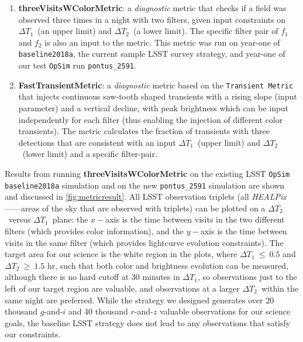 \documentclass[letterpaper,longauthor,trackchanges,twocolumn,onecolappendix,sort&compress]{aastex62}
\newcommand{\dtone}{\ensuremath{\Delta T_1}}
\newcommand{\dttwo}{\ensuremath{\Delta T_2}}
\begin{document}
\begin{enumerate}
\item
{\bf threeVisitsWColorMetric}: a {\it diagnostic} metric that checks if a field was observed three times in a night with two filters, given input constraints on \dtone\ (an upper limit) and \dttwo\ (a lower limit). The specific filter pair of $f_1$ and $f_2$ is also an input to the metric. This metric was run on year-one of {\tt baseline2018a}, the current sample LSST survey strategy, and year-one of our test {\tt OpSim} run {\tt pontus\_2591}. 
\item
{\bf FastTransientMetric}: a {\it diagnostic} metric based on the {\tt Transient Metric} that injects continuous saw-tooth shaped transients with a rising slope (input parameter) and a vertical decline, with peak brightness which can be input independently for each filter (thus enabling the injection of different color transients). The metric calculates the fraction of transients with three detections that are consistent with an input \dtone\ (upper limit) and \dttwo\ (lower limit) and a specific filter-pair.

\end{enumerate}
Results from running {\bf threeVisitsWColorMetric} on the existing LSST {\tt OpSim baseline2018a} simulation and on the new {\tt pontus\_2591} simulation are shown and discussed in \autoref{fig:metricresult}. All LSST observation triplets (all \emph{HEALPix} ---\citealt{Gorski05}---areas of the sky that are observed with triplets) can be plotted on a \dttwo\ versus \dtone\ plane: the $x-$axis is the time between visits in the two different filters (which provides color information), and the $y-$axis is the time between visits in the same filter (which provides lightcurve evolution constraints). The target area for our science is the white region in the plots, where $\dtone~\leq~0.5$ and $\dttwo~\geq~1.5$ hr, such that both color and brightness evolution can be measured, although there is no hard cutoff at 30 minutes in \dtone, so observations just to the left of our target region are valuable, and observations at a larger \dttwo\ within the same night are preferred. While the strategy we designed generates over 20 thousand $g$-and-$i$ and 40 thousand $r$-and-$z$ valuable observations for our science goals, the baseline LSST strategy does not lead to any observations that satisfy our constraints.
\end{document}
